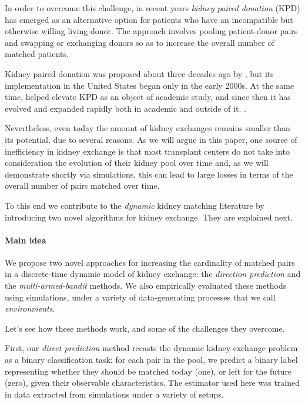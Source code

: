 \documentclass[format=acmsmall, review=false]{acmart}
\begin{document}
In order to overcome this challenge, in recent years \emph{kidney paired donation} (KPD) has emerged as an alternative option for patients who have an incompatible but otherwise willing living donor. The approach involves pooling patient-donor pairs and swapping or exchanging donors so as to increase the overall number of matched patients.

Kidney paired donation was proposed about three decades ago by \cite{rapaport1986case}, but its implementation in the United States began only in the early 2000s. At the same time, \cite{roth2004kidney} helped elevate KPD as an object of academic study, and since then it has evolved and expanded rapidly both in academic and outside of it. \citep{sonmez2013market}.

Nevertheless, even today the amount of kidney exchanges remains smaller than its potential, due to several reasons. As we will argue in this paper, one source of inefficiency in kidney exchange is that most transplant centers do not take into consideration the evolution of their kidney pool over time and, as we will demonstrate shortly via simulations, this can lead to large losses in terms of the overall number of pairs matched over time.

To this end we contribute to the \emph{dynamic} kidney matching literature by introducing two novel algorithms for kidney exchange. They are explained next.

\paragraph{\textbf{Main idea}} We propose two novel approaches for increasing the cardinality of matched pairs in a discrete-time dynamic model of kidney exchange: the \emph{direction prediction} and the \emph{multi-armed-bandit} methods. We also empirically evaluated these methods using simulations, under a variety of data-generating processes that we call \emph{environments}. 

Let's see how these methods work, and some of the challenges they overcome.

First, our \emph{direct prediction} method recasts the dynamic kidney exchange problem as a binary classification task: for each pair in the pool, we predict a binary label representing whether they should be matched today (one), or left for the future (zero), given their observable characteristics. The estimator used here was trained in data extracted from simulations under a variety of setups.
\end{document}
